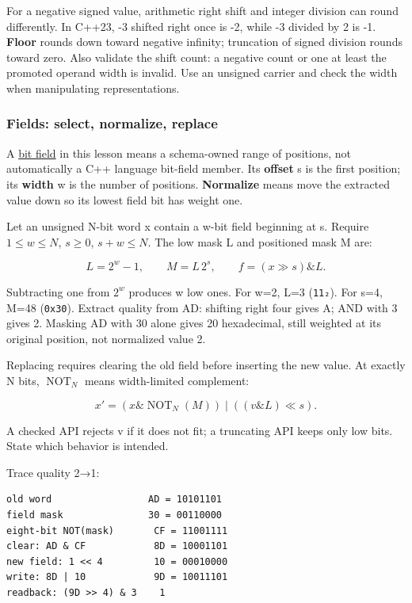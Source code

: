 For a negative signed value, arithmetic right shift and integer division can round differently. In C++23, -3 shifted right once is -2, while -3 divided by 2 is -1. \textbf{Floor} rounds down toward negative infinity; truncation of signed division rounds toward zero. Also validate the shift count: a negative count or one at least the promoted operand width is invalid. Use an unsigned carrier and check the width when manipulating representations.

\subsubsection{Fields: select, normalize, replace}\label{05-engine-i-ch001-fields-select-normalize-replace}

A \hyperref[appendix-ac697f5c66e8]{bit field} in this lesson means a schema-owned range of positions, not automatically a C++ language bit-field member. Its \textbf{offset} s is the first position; its \textbf{width} w is the number of positions. \textbf{Normalize} means move the extracted value down so its lowest field bit has weight one.

Let an unsigned N-bit word x contain a w-bit field beginning at s. Require \(1\le w\le N\), \(s\ge0\), \(s+w\le N\). The low mask L and positioned mask M are:

\[
L=2^w-1,\qquad M=L\,2^s,\qquad f=(x\gg s)\mathbin{\&}L.
\]

Subtracting one from \(2^w\) produces w low ones. For w=2, L=3 (\texttt{11₂}). For s=4, M=48 (\texttt{0x30}). Extract quality from AD: shifting right four gives A; AND with 3 gives 2. Masking AD with 30 alone gives 20 hexadecimal, still weighted at its original position, not normalized value 2.

Replacing requires clearing the old field before inserting the new value. At exactly N bits, \(\operatorname{NOT}_N\) means width-limited complement:

\[
x'=(x\mathbin{\&}\operatorname{NOT}_N(M))
\mathbin{|}((v\mathbin{\&}L)\ll s).
\]

A checked API rejects v if it does not fit; a truncating API keeps only low bits. State which behavior is intended.

Trace quality 2→1:

\begin{verbatim}
old word                 AD = 10101101
field mask               30 = 00110000
eight-bit NOT(mask)       CF = 11001111
clear: AD & CF            8D = 10001101
new field: 1 << 4         10 = 00010000
write: 8D | 10            9D = 10011101
readback: (9D >> 4) & 3    1
\end{verbatim}

